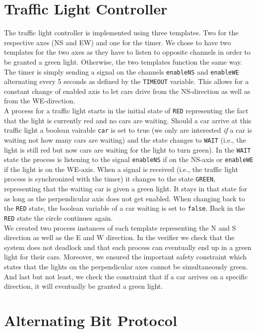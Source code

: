 \documentclass[10pt,bibliography=totocnumbered,listof=totocnumbered, footsepline, headsepline]{scrreprt}
\begin{document}
\section{Traffic Light Controller}

The traffic light controller is implemented using three templates. Two for the respective axes (NS and EW) and one for the timer. We chose to have two templates for the two axes as they have to listen to opposite channels in order to be granted a green light. Otherwise, the two templates function the same way.\\
The timer is simply sending a signal on the channels \texttt{enableNS} and \texttt{enableWE} alternating every 5 seconds as defined by the \texttt{TIMEOUT} variable. This allows for a constant change of enabled axis to let cars drive from the NS-direction as well as from the WE-direction.\\
A process for a traffic light starts in the initial state of \texttt{RED} representing the fact that the light is currently red and no cars are waiting. Should a car arrive at this traffic light a boolean vairable \texttt{car} is set to true (we only are interested \textit{if} a car is waiting not how many cars are waiting) and the state changes to \texttt{WAIT} (i.e., the light is still red but now cars are waiting for the light to turn green). In the \texttt{WAIT} state the process is listening to the signal \texttt{enableNS} if on the NS-axis or \texttt{enableWE} if the light is on the WE-axis. When a signal is received (i.e., the traffic light process is synchronized with the timer) it changes to the state \texttt{GREEN}, representing that the waiting car is given a green light. It stays in that state for as long as the perpendicular axis does not get enabled. When changing back to the \texttt{RED} state, the boolean variable of a car waiting is set to \texttt{false}. Back in the \texttt{RED} state the circle continues again.\\
We created two process instances of each template representing the N and S direction as well as the E and W direction. In the verifier we check that the system does not deadlock and that each process can eventually end up in a green light for their cars. Moreover, we ensured the important safety constraint which states that the lights on the perpendicular axes cannot be simultaneously green. And last but not least, we check the constraint that if a car arrives on a specific direction, it will eventually be granted a green light.

\section{Alternating Bit Protocol}
\end{document}
